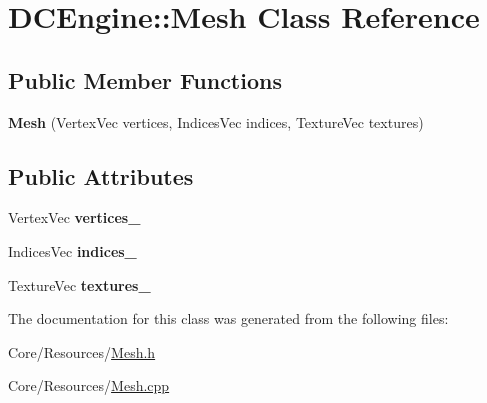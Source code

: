 \hypertarget{classDCEngine_1_1Mesh}{\section{D\-C\-Engine\-:\-:Mesh Class Reference}
\label{classDCEngine_1_1Mesh}
}
\subsection*{Public Member Functions}
\begin{DoxyCompactItemize}
\item 
\hypertarget{classDCEngine_1_1Mesh_a3b74085642a4307031cbb3f3e3bfb3b0}{{\bfseries Mesh} (Vertex\-Vec vertices, Indices\-Vec indices, Texture\-Vec textures)}\label{classDCEngine_1_1Mesh_a3b74085642a4307031cbb3f3e3bfb3b0}

\end{DoxyCompactItemize}
\subsection*{Public Attributes}
\begin{DoxyCompactItemize}
\item 
\hypertarget{classDCEngine_1_1Mesh_a20c2107d64c3f414c48578bfb10ef509}{Vertex\-Vec {\bfseries vertices\-\_\-}}\label{classDCEngine_1_1Mesh_a20c2107d64c3f414c48578bfb10ef509}

\item 
\hypertarget{classDCEngine_1_1Mesh_a25be4955a24d39b2bab6040777b95183}{Indices\-Vec {\bfseries indices\-\_\-}}\label{classDCEngine_1_1Mesh_a25be4955a24d39b2bab6040777b95183}

\item 
\hypertarget{classDCEngine_1_1Mesh_a87bafe684daa9ae36416dede391fd78f}{Texture\-Vec {\bfseries textures\-\_\-}}\label{classDCEngine_1_1Mesh_a87bafe684daa9ae36416dede391fd78f}

\end{DoxyCompactItemize}


The documentation for this class was generated from the following files\-:\begin{DoxyCompactItemize}
\item 
Core/\-Resources/\hyperlink{Mesh_8h}{Mesh.\-h}\item 
Core/\-Resources/\hyperlink{Mesh_8cpp}{Mesh.\-cpp}\end{DoxyCompactItemize}

